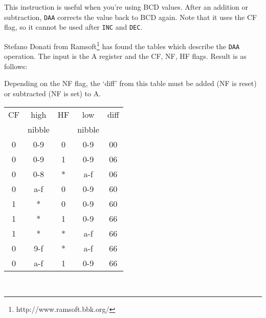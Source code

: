 \documentclass[oneside,a4paper]{book}
\begin{document}
This instruction is useful when you're using BCD values. After an addition or subtraction, {\tt DAA} corrects the value back to BCD again.  Note that it uses the CF flag, so it cannot be used after {\tt INC} and {\tt DEC}.

Stefano Donati from Ramsoft\footnote{http://www.ramsoft.bbk.org/} has found the tables which describe the {\tt DAA} operation. The input is the A register and the CF, NF, HF flags. Result is as follows:

Depending on the NF flag, the `diff' from this table must be added (NF is reset) or subtracted (NF is set) to A.

 
\begin{tabular}{c|c|c|c|c}
	CF &  high   & HF & low    & diff \\
	&  nibble &    & nibble &      \\
	\hline
	0 & 0-9     &  0 & 0-9    &  00  \\
	0 & 0-9     &  1 & 0-9    &  06  \\
	0 & 0-8     &  * & a-f    &  06  \\
	0 & a-f     &  0 & 0-9    &  60  \\
	1 &  *      &  0 & 0-9    &  60  \\
	1 &  *      &  1 & 0-9    &  66  \\
	1 &  *      &  * & a-f    &  66  \\
	0 & 9-f     &  * & a-f    &  66  \\
	0 & a-f     &  1 & 0-9    &  66  \\
	\hline
\end{tabular}\\[1ex]
\end{document}
